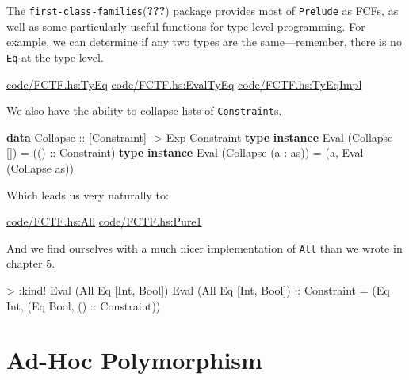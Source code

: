 \documentclass[
  11pt,
]{book}
\newenvironment{Shaded}{}{}
\newcommand{\CharTok}[1]{\textcolor[rgb]{0.25,0.44,0.63}{#1}}
\newcommand{\DataTypeTok}[1]{\textcolor[rgb]{0.56,0.13,0.00}{#1}}
\newcommand{\KeywordTok}[1]{\textcolor[rgb]{0.00,0.44,0.13}{\textbf{#1}}}
\newcommand{\NormalTok}[1]{#1}
\newcommand{\OperatorTok}[1]{\textcolor[rgb]{0.40,0.40,0.40}{#1}}
\newcommand{\OtherTok}[1]{\textcolor[rgb]{0.00,0.44,0.13}{#1}}
\theoremstyle{nonumberplain}
\begin{document}
The \texttt{first-class-families}({\textbf{???}}) package provides most
of \texttt{Prelude} as FCFs, as well as some particularly useful
functions for type-level programming. For example, we can determine if
any two types are the same---remember, there is no \texttt{Eq} at the
type-level.

\href{Snip}{code/FCTF.hs:TyEq} \href{Snip}{code/FCTF.hs:EvalTyEq}
\href{Snip}{code/FCTF.hs:TyEqImpl}

We also have the ability to collapse lists of \texttt{Constraint}s.

\begin{Shaded}
\begin{Highlighting}[]
\KeywordTok{data} \DataTypeTok{Collapse}\OtherTok{ ::}\NormalTok{ [}\DataTypeTok{Constraint}\NormalTok{] }\OtherTok{{-}\textgreater{}} \DataTypeTok{Exp} \DataTypeTok{Constraint}
\KeywordTok{type} \KeywordTok{instance} \DataTypeTok{Eval}\NormalTok{ (}\DataTypeTok{Collapse} \CharTok{\textquotesingle{}[]) =}
\NormalTok{  (}\OtherTok{() ::} \DataTypeTok{Constraint}\NormalTok{)}
\KeywordTok{type} \KeywordTok{instance} \DataTypeTok{Eval}\NormalTok{ (}\DataTypeTok{Collapse}\NormalTok{ (a }\CharTok{\textquotesingle{}: as)) =}
\NormalTok{  (a, }\DataTypeTok{Eval}\NormalTok{ (}\DataTypeTok{Collapse}\NormalTok{ as))}
\end{Highlighting}
\end{Shaded}

Which leads us very naturally to:

\href{Snip}{code/FCTF.hs:All} \href{Snip}{code/FCTF.hs:Pure1}

And we find ourselves with a much nicer implementation of \texttt{All}
than we wrote in chapter 5.

\begin{Shaded}
\begin{Highlighting}[]
\OperatorTok{\textgreater{}} \OperatorTok{:}\NormalTok{kind}\OperatorTok{!} \DataTypeTok{Eval}\NormalTok{ (}\DataTypeTok{All} \DataTypeTok{Eq} \CharTok{\textquotesingle{}[Int, Bool])}
\DataTypeTok{Eval}\NormalTok{ (}\DataTypeTok{All} \DataTypeTok{Eq} \CharTok{\textquotesingle{}[Int, Bool]) :: Constraint}
\OtherTok{=}\NormalTok{ (}\DataTypeTok{Eq} \DataTypeTok{Int}\NormalTok{, (}\DataTypeTok{Eq} \DataTypeTok{Bool}\NormalTok{,}\OtherTok{ () ::} \DataTypeTok{Constraint}\NormalTok{))}
\end{Highlighting}
\end{Shaded}

\hypertarget{ad-hoc-polymorphism}{%
\section{Ad-Hoc Polymorphism}\label{ad-hoc-polymorphism}}
\end{document}
